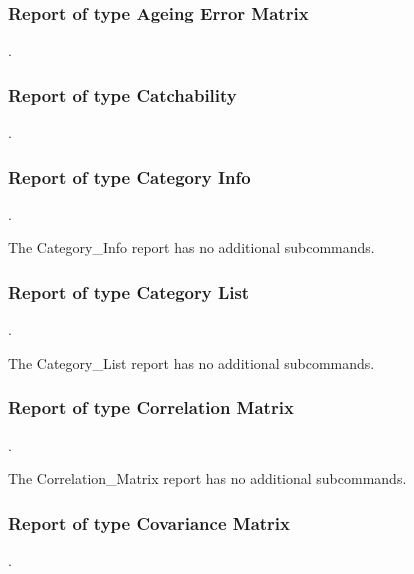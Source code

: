 \subsubsection{Report of type Ageing Error Matrix}
.
\label{syntax:Report-AgeingErrorMatrix}


\subsubsection{Report of type Catchability}
.
\label{syntax:Report-Catchability}


\subsubsection{Report of type Category Info}
.
\label{syntax:Report-CategoryInfo}

The Category\_Info report has no additional subcommands.

\subsubsection{Report of type Category List}
.
\label{syntax:Report-CategoryList}

The Category\_List report has no additional subcommands.

\subsubsection{Report of type Correlation Matrix}
.
\label{syntax:Report-CorrelationMatrix}

The Correlation\_Matrix report has no additional subcommands.

\subsubsection{Report of type Covariance Matrix}
.
\label{syntax:Report-CovarianceMatrix}


